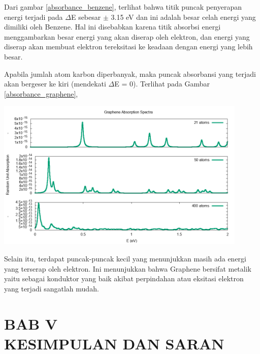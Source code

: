 \documentclass[12pt,a4paper]{report}
\begin{document}
Dari gambar \ref{absorbance_benzene}, terlihat bahwa titik puncak penyerapan energi terjadi pada $\Delta$E sebesar $\pm$ 3.15 eV dan ini adalah besar celah energi yang dimiliki oleh Benzene. Hal ini disebabkan karena titik absorbsi energi menggambarkan besar energi yang akan diserap oleh elektron, dan energi yang diserap akan membuat elektron tereksitasi ke keadaan dengan energi yang lebih besar.

Apabila jumlah atom karbon diperbanyak, maka puncak absorbansi yang terjadi akan bergeser ke kiri (mendekati $\Delta$E = 0). Terlihat pada Gambar \ref{absorbance_graphene},
\begin{center}
	\includegraphics[width=12cm]{gambar/spectra-graphene.png}
	\label{absorbance_graphene}
\end{center}

Selain itu, terdapat puncak-puncak kecil yang menunjukkan masih ada energi yang terserap oleh elektron. Ini menunjukkan bahwa Graphene bersifat metalik yaitu sebagai konduktor yang baik akibat perpindahan atau eksitasi elektron yang terjadi sangatlah mudah.


\chapter*{BAB V \\ KESIMPULAN DAN SARAN}
\setcounter{chapter}{5}
\setcounter{section}{0}
\setcounter{figure}{0}
\thispagestyle{myplain}
\end{document}
